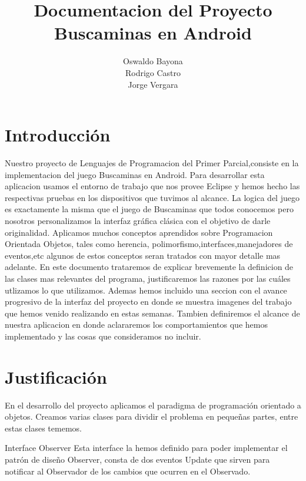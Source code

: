\documentclass[11pt]{article} %
\title{Documentacion del Proyecto Buscaminas en Android}
\author{Oswaldo Bayona\\Rodrigo Castro\\Jorge Vergara}
\begin{document}
\maketitle

\section{Introducción}

Nuestro proyecto de Lenguajes de Programacion del Primer Parcial,consiste en la implementacion del juego Buscaminas en Android. 
Para desarrollar esta aplicacion usamos el entorno de trabajo que nos provee Eclipse y hemos hecho las respectivas pruebas en los dispositivos que tuvimos al alcance. 
La logica del juego es exactamente la misma que el juego de Buscaminas que todos conocemos pero nosotros personalizamos la interfaz gráfica clásica con el objetivo de darle originalidad. 
Aplicamos muchos conceptos aprendidos sobre Programacion Orientada Objetos, tales como herencia, polimorfismo,interfaces,manejadores de eventos,etc algunos de estos conceptos seran tratados con mayor detalle mas adelante.
En este documento trataremos de explicar brevemente la definicion de las clases mas relevantes del programa, justificaremos las razones por las cuáles utlizamos lo que utilizamos.
Ademas hemos incluido una seccion con el avance progresivo de la interfaz del proyecto en donde se muestra imagenes del trabajo que hemos venido realizando en estas semanas.
Tambien definiremos el alcance de nuestra aplicacion en donde aclararemos los comportamientos que hemos implementado y las cosas que consideramos no incluir.

\section{Justificación}



En el desarrollo del proyecto aplicamos el paradigma de programación orientado a objetos. Creamos varias clases para dividir el problema en pequeñas partes, entre estas clases tememos.

Interface Observer
Esta interface la hemos definido para poder implementar el patrón de diseño Observer, consta de dos eventos Update que sirven para notificar al Observador de los cambios que ocurren en el Observado.
\end{document}
